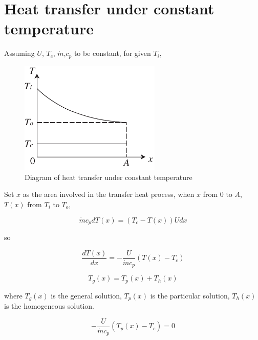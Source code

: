 \appendix

\renewcommand{\theequation}{\Alph{chapter}-\arabic{equation}}
\renewcommand{\thefigure}{\Alph{chapter}-\arabic{figure}}

\chapter{Heat transfer under constant temperature}
\label{cha:CTHX}
Assuming $U$, $T_{c}$, $\dot{m}$,$c_{p}$ to be constant, for given $T_{i}$,

\begin{figure}[h]
\centering
\includegraphics[width=0.6\textwidth]{fig/ConstTempHX.pdf}
\caption{Diagram of heat transfer under constant temperature}
\label{fig:CTHX}
\end{figure}
 
Set $x$ as the area involved in the transfer heat process, when $x$ from $0$ to $A$, $T(x)$ from $T_{i}$ to $T_{o}$,

\begin{equation}
\dot{m}c_{p}dT(x)=(T_{c}-T(x))Udx
\end{equation}

so

\begin{equation}
\frac{dT(x)}{dx}=-\frac{U}{\dot{m}c_{p}}(T(x)-T_{c})
\end{equation}

\begin{equation}
T_{g}(x)=T_{p}(x)+T_{h}(x)
\end{equation}

where $T_{g}(x)$ is the general solution, $T_{p}(x)$ is the particular
solution, $T_{h}(x)$ is the homogeneous solution.

\begin{equation}
-\frac{U}{\dot{m}c_{p}}(T_{p}(x)-T_{c})=0
\end{equation}

